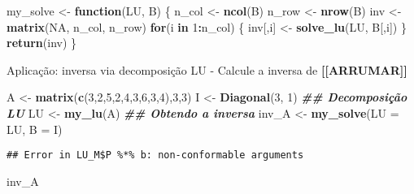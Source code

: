 \documentclass[
]{article}
\newenvironment{Shaded}{\begin{snugshade}}{\end{snugshade}}
\newcommand{\AttributeTok}[1]{\textcolor[rgb]{0.13,0.29,0.53}{#1}}
\newcommand{\ConstantTok}[1]{\textcolor[rgb]{0.56,0.35,0.01}{#1}}
\newcommand{\ControlFlowTok}[1]{\textcolor[rgb]{0.13,0.29,0.53}{\textbf{#1}}}
\newcommand{\DecValTok}[1]{\textcolor[rgb]{0.00,0.00,0.81}{#1}}
\newcommand{\DocumentationTok}[1]{\textcolor[rgb]{0.56,0.35,0.01}{\textbf{\textit{#1}}}}
\newcommand{\FunctionTok}[1]{\textcolor[rgb]{0.13,0.29,0.53}{\textbf{#1}}}
\newcommand{\NormalTok}[1]{#1}
\newcommand{\OtherTok}[1]{\textcolor[rgb]{0.56,0.35,0.01}{#1}}
\newcommand{\SpecialCharTok}[1]{\textcolor[rgb]{0.81,0.36,0.00}{\textbf{#1}}}
\begin{document}
\begin{Shaded}
\begin{Highlighting}[]
\NormalTok{my\_solve }\OtherTok{\textless{}{-}} \ControlFlowTok{function}\NormalTok{(LU, B) \{}
\NormalTok{  n\_col }\OtherTok{\textless{}{-}} \FunctionTok{ncol}\NormalTok{(B)}
\NormalTok{  n\_row }\OtherTok{\textless{}{-}} \FunctionTok{nrow}\NormalTok{(B)}
\NormalTok{  inv }\OtherTok{\textless{}{-}} \FunctionTok{matrix}\NormalTok{(}\ConstantTok{NA}\NormalTok{, n\_col, n\_row)}
  \ControlFlowTok{for}\NormalTok{(i }\ControlFlowTok{in} \DecValTok{1}\SpecialCharTok{:}\NormalTok{n\_col) \{}
\NormalTok{    inv[,i] }\OtherTok{\textless{}{-}} \FunctionTok{solve\_lu}\NormalTok{(LU, B[,i])}
\NormalTok{  \}}
  \FunctionTok{return}\NormalTok{(inv)}
\NormalTok{\}}
\end{Highlighting}
\end{Shaded}

Aplicação: inversa via decomposição LU - Calcule a inversa de
\textbf{{[}{[}ARRUMAR{]}{]}}

\begin{Shaded}
\begin{Highlighting}[]
\NormalTok{A }\OtherTok{\textless{}{-}} \FunctionTok{matrix}\NormalTok{(}\FunctionTok{c}\NormalTok{(}\DecValTok{3}\NormalTok{,}\DecValTok{2}\NormalTok{,}\DecValTok{5}\NormalTok{,}\DecValTok{2}\NormalTok{,}\DecValTok{4}\NormalTok{,}\DecValTok{3}\NormalTok{,}\DecValTok{6}\NormalTok{,}\DecValTok{3}\NormalTok{,}\DecValTok{4}\NormalTok{),}\DecValTok{3}\NormalTok{,}\DecValTok{3}\NormalTok{)}
\NormalTok{I }\OtherTok{\textless{}{-}} \FunctionTok{Diagonal}\NormalTok{(}\DecValTok{3}\NormalTok{, }\DecValTok{1}\NormalTok{)}
\DocumentationTok{\#\# Decomposição LU}
\NormalTok{LU }\OtherTok{\textless{}{-}} \FunctionTok{my\_lu}\NormalTok{(A)}
\DocumentationTok{\#\# Obtendo a inversa}
\NormalTok{inv\_A }\OtherTok{\textless{}{-}} \FunctionTok{my\_solve}\NormalTok{(}\AttributeTok{LU =}\NormalTok{ LU, }\AttributeTok{B =}\NormalTok{ I)}
\end{Highlighting}
\end{Shaded}

\begin{verbatim}
## Error in LU_M$P %*% b: non-conformable arguments
\end{verbatim}

\begin{Shaded}
\begin{Highlighting}[]
\NormalTok{inv\_A}
\end{Highlighting}
\end{Shaded}
\end{document}
